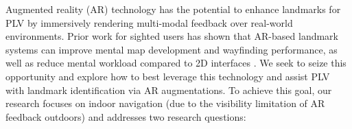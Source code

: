 Augmented reality (AR) technology has the potential to enhance landmarks for PLV by immersively rendering multi-modal feedback over real-world environments. Prior work for sighted users has shown that AR-based landmark systems can improve mental map development and wayfinding performance, as well as reduce mental workload compared to 2D interfaces \cite{mckendrick2016into, zhang2021enhancing}. We seek to seize this opportunity and explore how to best leverage this technology and assist PLV with landmark identification via AR augmentations. To achieve this goal, our research focuses on indoor navigation (due to the visibility limitation of AR feedback outdoors) and addresses two research questions:

